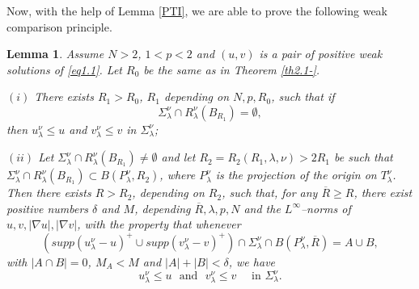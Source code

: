 \documentclass[12pt]{amsart}
\newtheorem{lem}[thm]{Lemma}
\theoremstyle{definition}
\theoremstyle{remark}
\theoremstyle{conclusion}
\theoremstyle{conjecture}
\numberwithin{equation}{section}
\begin{document}
Now, with the help of Lemma \ref{PTI}, we are able to prove the following weak comparison principle.
\begin{lem}\label{lm.4.1}
Assume $N>2$, $1<p<2$ and $(u, v)$ is a pair of positive weak solutions of \eqref{eq1.1}. Let $R_0$ be the same as in Theorem \ref{th2.1-}.

{\bf $(i)$} There exists $R_1>R_0$, $R_1$ depending on $N,p,R_0$, such that if
$$\Sigma_\lambda^\nu \cap R_\lambda^\nu(B_{R_1}) = \emptyset,$$
then $u^{\nu}_{\lambda} \leq u$ and $v^{\nu}_{\lambda} \leq v$ in $\Sigma_\lambda^\nu$;


{\bf $(ii)$} Let $\Sigma_\lambda^\nu \cap R_\lambda^\nu(B_{R_1}) \neq \emptyset$ and let $R_2=R_2(R_1,\lambda,\nu)>2R_{1}$ be such that $\Sigma_\lambda^\nu \cap R_\lambda^\nu(B_{R_1}) \subset B(P_\lambda^\nu,R_2)$, where $P_\lambda^\nu$ is the projection of the origin on $T_\lambda^\nu$.
Then there exists $R>R_2$, depending on $R_2$, such that, for any $\overline{R}\geq R$, there exist positive numbers $\delta$ and $M$, depending $\overline{R},\lambda,p,N$ and the $L^\infty$--norms of $u,v,|\nabla u|,|\nabla v|$, with the property that whenever
$$ (supp(u^{\nu}_{\lambda}-u)^+\cup supp(v^{\nu}_{\lambda}-v)^+)\cap\Sigma^{\nu}_{\lambda}\cap B(P_\lambda^\nu,\overline{R})=A \cup B,$$
with $|A\cap B|=0$, $M_A<M$ and $|A|+|B|<\delta$, we have
$$ u^{\nu}_{\lambda} \leq u\,\,\,\,\mbox{and}\,\,\,\, v^{\nu}_{\lambda} \leq v \,\,\quad \mbox{in}\,\,\Sigma_\lambda^\nu.$$
\end{lem}
\end{document}
